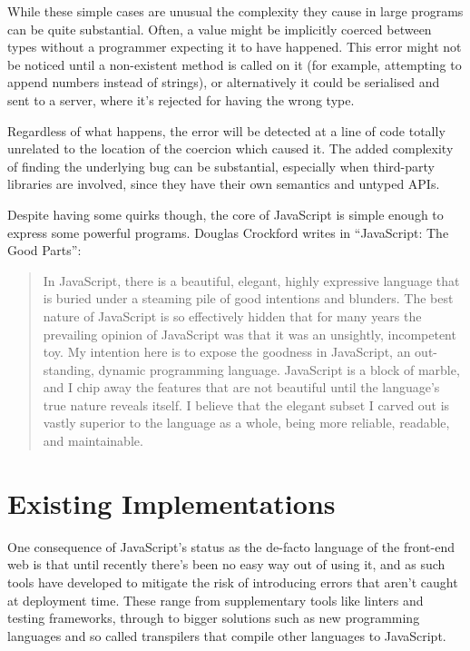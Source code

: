 \documentclass[british, twoside]{bhamthesis}
\theoremstyle{definition}
\begin{document}
    While these simple cases are unusual the complexity they cause in large programs can be quite substantial. Often, a value might be implicitly coerced between types without a programmer expecting it to have happened. This error might not be noticed until a non-existent method is called on it (for example, attempting to append numbers instead of strings), or alternatively it could be serialised and sent to a server, where it's rejected for having the wrong type.

    Regardless of what happens, the error will be detected at a line of code totally unrelated to the location of the coercion which caused it. The added complexity of finding the underlying bug can be substantial, especially when third-party libraries are involved, since they have their own semantics and untyped APIs.

    Despite having some quirks though, the core of JavaScript is simple enough to express some powerful programs. Douglas Crockford writes in “JavaScript: The Good Parts”:

    \begin{quote}
      In JavaScript, there is a beautiful, elegant, highly expressive language that is buried under a steaming pile of good intentions and blunders. The best nature of JavaScript is so effectively hidden that for many years the prevailing opinion of JavaScript was that it was an unsightly, incompetent toy. My intention here is to expose the goodness in JavaScript, an out- standing, dynamic programming language. JavaScript is a block of marble, and I chip away the features that are not beautiful until the language’s true nature reveals itself. I believe that the elegant subset I carved out is vastly superior to the language as a whole, being more reliable, readable, and maintainable.
    \end{quote}
    \autocite{Crockford2008}

  \section{Existing Implementations}
    One consequence of JavaScript's status as the de-facto language of the front-end web is that until recently there's been no easy way out of using it, and as such tools have developed to mitigate the risk of introducing errors that aren't caught at deployment time. These range from supplementary tools like linters and testing frameworks, through to bigger solutions such as new programming languages and so called transpilers that compile other languages to JavaScript.
\end{document}
